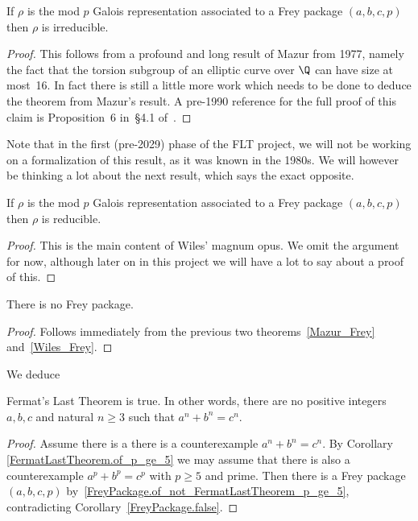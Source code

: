 \begin{theorem}[Mazur]
  \label{Mazur_Frey}
  \leanok
  If $\rho$ is the mod $p$ Galois representation associated to a Frey package $(a,b,c,p)$ then
  $\rho$ is irreducible.
\end{theorem}
\begin{proof}
  \notready
  This follows from a profound and long result of Mazur \cite{mazur-torsion} from 1977,
  namely the fact that the torsion subgroup of an elliptic curve over $\Q$ can have size at most~16.
  In fact there is still a little more work which needs to be done to deduce the theorem from
  Mazur's result. A pre-1990 reference for the full proof of this claim is Proposition~6
  in~\S4.1 of~\cite{serreconj}.
\end{proof}

Note that in the first (pre-2029) phase of the FLT project, we will not be working on
a formalization of this result, as it was known in the 1980s. We will however be thinking
a lot about the next result, which says the exact opposite.

\begin{theorem}
  \label{Wiles_Frey}
  \leanok
  If $\rho$ is the mod $p$ Galois representation associated to a Frey package $(a,b,c,p)$ then
  $\rho$ is reducible.
\end{theorem}
\begin{proof}
  This is the main content of Wiles' magnum opus.
  We omit the argument for now, although later on in this project
  we will have a lot to say about a proof of this.
\end{proof}

\begin{corollary}
  \label{FreyPackage.false}
  \leanok
  There is no Frey package.
\end{corollary}
\begin{proof} Follows immediately from the previous two
  theorems~\ref{Mazur_Frey} and~\ref{Wiles_Frey}.
\end{proof}

We deduce

\begin{corollary}
  \label{FLT}
  \leanok
  Fermat's Last Theorem is true. In other words, there are no positive integers $a,b,c$ and
  natural $n\geq3$ such that $a^n+b^n=c^n$.
\end{corollary}
\begin{proof}
  Assume there is a there is a counterexample $a^n+b^n=c^n$.
  By Corollary \ref{FermatLastTheorem.of_p_ge_5} we may assume that there is also a counterexample
  $a^p+b^p=c^p$ with $p\geq 5$ and prime.
  Then there is a Frey package $(a,b,c,p)$ by~\ref{FreyPackage.of_not_FermatLastTheorem_p_ge_5},
  contradicting Corollary~\ref{FreyPackage.false}.
\end{proof}

